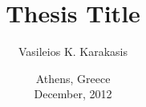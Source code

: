 \documentclass{cslabthesis}
\author{Vasileios K. Karakasis}
\title{Thesis Title}
\date{Athens, Greece \\ December, 2012}
\begin{document}
\maketitle




\frontmatter
\tableofcontents

\cleardoublepage
\listoffigures

\cleardoublepage
\listoftables

\cleardoublepage
\listofalgorithms

\mainmatter


\backmatter

\cleardoublepage
\printindex
\end{document}
